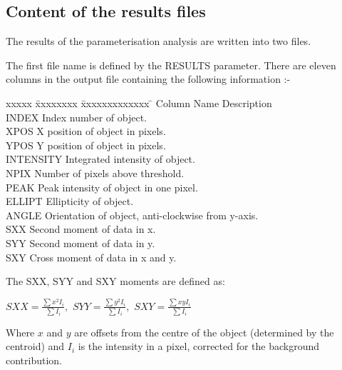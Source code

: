 \subsection{Content\label{RESULTS} of the results files}
The results of the parameterisation analysis are written into two
files.

The first file name is defined by the RESULTS parameter. There are
eleven columns in the output file containing the following information
:-

\begin{center}
\begin{tabbing}
xxxxx \= xxxxxxxx \= xxxxxxxxxxxxx \= \kill
\> Column \> Name  \> Description \\
 \> INDEX \> Index number of object.\\
 \> XPOS \> X position of object in pixels.\\
 \> YPOS \> Y position of object in pixels.\\
 \> INTENSITY \> Integrated intensity of object.\\
 \> NPIX \> Number of pixels above threshold.\\
 \> PEAK \> Peak intensity of object in one pixel.\\
 \> ELLIPT \> Ellipticity of object.\\
 \> ANGLE \> Orientation of object, anti-clockwise from y-axis.\\
 \> SXX \> Second moment of data in x.\\
 \> SYY \> Second moment of data in y.\\
 \> SXY \> Cross moment of data in x and y.\\
\end{tabbing}
\end{center}

The SXX, SYY and SXY moments are defined as:
\begin{center}
\begin{math}
SXX = \frac{\sum{x^{2}I_{i}}}{\sum{I_{i}}}, \, \,
SYY = \frac{\sum{y^{2}I_{i}}}{\sum{I_{i}}}, \, \,
SXY = \frac{\sum{xyI_{i}}}{\sum{I_{i}}}
\end{math}
\end{center}
Where $x$ and $y$ are offsets from the centre of the object (determined
by the centroid) and $I_{i}$ is the intensity in a pixel, corrected for
the background contribution.

